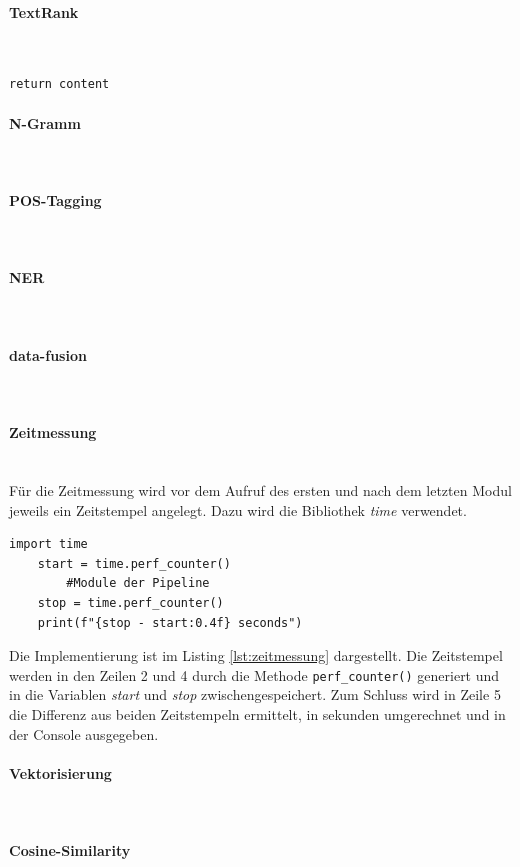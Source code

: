 \paragraph{TextRank}\mbox{}\\
\begin{lstlisting}[caption={Implementation des Moduls \emph{textRankingAlgorithm.py}}, label=lst:textrank]
	return content
\end{lstlisting}

\paragraph{N-Gramm}\mbox{}\\

\paragraph{POS-Tagging}\mbox{}\\

\paragraph{NER}\mbox{}\\

\paragraph{data-fusion}\mbox{}\\

\paragraph{Zeitmessung}\mbox{}\\
Für die Zeitmessung wird vor dem Aufruf des ersten und nach dem letzten Modul jeweils ein Zeitstempel angelegt. Dazu wird die Bibliothek \emph{time} verwendet.
\begin{lstlisting}[caption={Implementation der Zeitmessung}, label=lst:zeitmessung]
	import time
	start = time.perf_counter()
		#Module der Pipeline
	stop = time.perf_counter()
	print(f"{stop - start:0.4f} seconds")
\end{lstlisting}
Die Implementierung ist im Listing \ref{lst:zeitmessung} dargestellt. Die Zeitstempel werden in den Zeilen 2 und 4 durch die Methode \lstinline{perf_counter()}
generiert und in die Variablen \emph{start} und \emph{stop} zwischengespeichert. Zum Schluss wird in Zeile 5 die Differenz aus beiden Zeitstempeln ermittelt, in sekunden umgerechnet und in der Console ausgegeben.
\paragraph{Vektorisierung}\mbox{}\\

\paragraph{Cosine-Similarity}\mbox{}\\